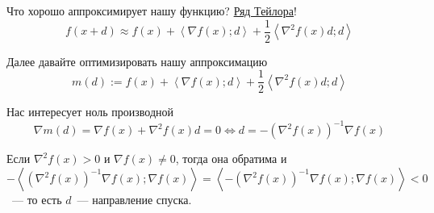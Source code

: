 \begin{remark}
  Что хорошо аппроксимирует нашу функцию? \hyperref[note:F7C9E077-9CAB-4149-83B4-67923B49E2F6]{Ряд Тейлора}!
  \[
  f(x+d) \approx f(x) + \left\langle \nabla f(x); d \right\rangle + \frac{1}{2} \left\langle \nabla^2 f(x)d; d \right\rangle
  \]

  Далее давайте оптимизировать нашу аппроксимацию
  \[
  m(d):= f(x) + \left\langle \nabla f(x); d \right\rangle + \frac{1}{2} \left\langle \nabla^2 f(x)d; d \right\rangle
  \]

  Нас интересует ноль производной
  \[
  \nabla m(d) = \nabla f(x) + \nabla^2f(x)d = 0 \Leftrightarrow d = - \left( \nabla^2 f(x) \right)^{-1} \nabla f(x)
  \]

  \begin{remark}
    Если $\nabla^2 f(x) > 0$ и $\nabla f(x) \ne 0$, тогда она обратима и $- \left\langle (\nabla^2 f(x) )^{-1}  \nabla f(x); \nabla f(x) \right\rangle =\left\langle -(\nabla^2 f(x) )^{-1}  \nabla f(x); \nabla f(x) \right\rangle < 0$~--- то есть $d$~--- направление спуска.
  \end{remark}
\end{remark}
